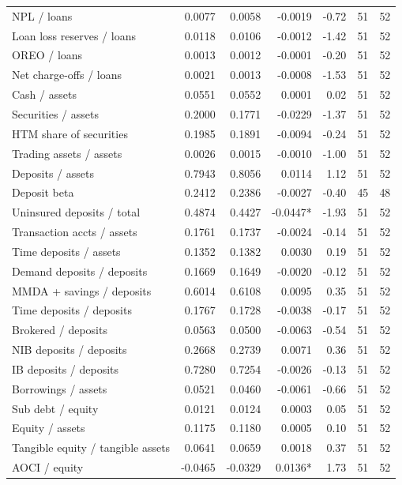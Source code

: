 \begin{tabular}{lrrrrrr}
NPL / loans & 0.0077 & 0.0058 & -0.0019 & -0.72 & 51 & 52 \\
Loan loss reserves / loans & 0.0118 & 0.0106 & -0.0012 & -1.42 & 51 & 52 \\
OREO / loans & 0.0013 & 0.0012 & -0.0001 & -0.20 & 51 & 52 \\
Net charge-offs / loans & 0.0021 & 0.0013 & -0.0008 & -1.53 & 51 & 52 \\
Cash / assets & 0.0551 & 0.0552 & 0.0001 & 0.02 & 51 & 52 \\
Securities / assets & 0.2000 & 0.1771 & -0.0229 & -1.37 & 51 & 52 \\
HTM share of securities & 0.1985 & 0.1891 & -0.0094 & -0.24 & 51 & 52 \\
Trading assets / assets & 0.0026 & 0.0015 & -0.0010 & -1.00 & 51 & 52 \\
Deposits / assets & 0.7943 & 0.8056 & 0.0114 & 1.12 & 51 & 52 \\
Deposit beta & 0.2412 & 0.2386 & -0.0027 & -0.40 & 45 & 48 \\
Uninsured deposits / total & 0.4874 & 0.4427 & -0.0447* & -1.93 & 51 & 52 \\
Transaction accts / assets & 0.1761 & 0.1737 & -0.0024 & -0.14 & 51 & 52 \\
Time deposits / assets & 0.1352 & 0.1382 & 0.0030 & 0.19 & 51 & 52 \\
Demand deposits / deposits & 0.1669 & 0.1649 & -0.0020 & -0.12 & 51 & 52 \\
MMDA + savings / deposits & 0.6014 & 0.6108 & 0.0095 & 0.35 & 51 & 52 \\
Time deposits / deposits & 0.1767 & 0.1728 & -0.0038 & -0.17 & 51 & 52 \\
Brokered / deposits & 0.0563 & 0.0500 & -0.0063 & -0.54 & 51 & 52 \\
NIB deposits / deposits & 0.2668 & 0.2739 & 0.0071 & 0.36 & 51 & 52 \\
IB deposits / deposits & 0.7280 & 0.7254 & -0.0026 & -0.13 & 51 & 52 \\
Borrowings / assets & 0.0521 & 0.0460 & -0.0061 & -0.66 & 51 & 52 \\
Sub debt / equity & 0.0121 & 0.0124 & 0.0003 & 0.05 & 51 & 52 \\
Equity / assets & 0.1175 & 0.1180 & 0.0005 & 0.10 & 51 & 52 \\
Tangible equity / tangible assets & 0.0641 & 0.0659 & 0.0018 & 0.37 & 51 & 52 \\
AOCI / equity & -0.0465 & -0.0329 & 0.0136* & 1.73 & 51 & 52 \\

\end{tabular}
